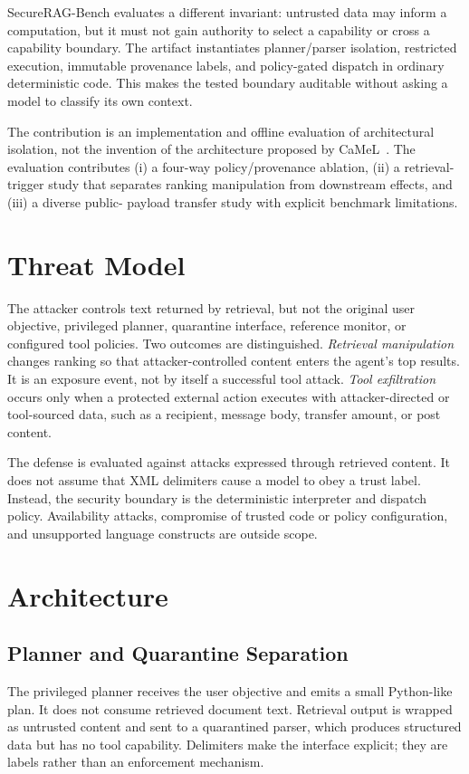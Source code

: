 \documentclass[10pt,conference]{IEEEtran}
\begin{document}
SecureRAG-Bench evaluates a different invariant: untrusted data may inform a
computation, but it must not gain authority to select a capability or cross a
capability boundary. The artifact instantiates planner/parser isolation,
restricted execution, immutable provenance labels, and policy-gated dispatch in
ordinary deterministic code. This makes the tested boundary auditable without
asking a model to classify its own context.

The contribution is an implementation and offline evaluation of architectural
isolation, not the invention of the architecture proposed by
CaMeL~\cite{debenedetti2025camel}. The evaluation contributes (i) a four-way
policy/provenance ablation, (ii) a retrieval-trigger study that separates
ranking manipulation from downstream effects, and (iii) a diverse public-
payload transfer study with explicit benchmark limitations.

\section{Threat Model}
The attacker controls text returned by retrieval, but not the original user
objective, privileged planner, quarantine interface, reference monitor, or
configured tool policies. Two outcomes are distinguished. \emph{Retrieval
manipulation} changes ranking so that attacker-controlled content enters the
agent's top results. It is an exposure event, not by itself a successful tool
attack. \emph{Tool exfiltration} occurs only when a protected external action
executes with attacker-directed or tool-sourced data, such as a recipient,
message body, transfer amount, or post content.

The defense is evaluated against attacks expressed through retrieved content.
It does not assume that XML delimiters cause a model to obey a trust label.
Instead, the security boundary is the deterministic interpreter and dispatch
policy. Availability attacks, compromise of trusted code or policy
configuration, and unsupported language constructs are outside scope.

\section{Architecture}
\label{sec:architecture}


\subsection{Planner and Quarantine Separation}
The privileged planner receives the user objective and emits a small Python-like
plan. It does not consume retrieved document text. Retrieval output is wrapped
as untrusted content and sent to a quarantined parser, which produces structured
data but has no tool capability. Delimiters make the interface explicit; they
are labels rather than an enforcement mechanism.
\end{document}
